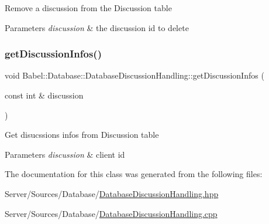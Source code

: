 Remove a discussion from the Discussion table 
\begin{DoxyParams}{Parameters}
{\em discussion} & the discussion id to delete \\
\hline
\end{DoxyParams}
\mbox{\label{classBabel_1_1Database_1_1DatabaseDiscussionHandling_ab4071036b7704d7acba7c09aa77c9d89}} 
\subsubsection{\texorpdfstring{get\+Discussion\+Infos()}{getDiscussionInfos()}}
{\footnotesize\ttfamily void Babel\+::\+Database\+::\+Database\+Discussion\+Handling\+::get\+Discussion\+Infos (\begin{DoxyParamCaption}\item[{const int \&}]{discussion }\end{DoxyParamCaption})}

Get disucssions infos from Discussion table 
\begin{DoxyParams}{Parameters}
{\em discussion} & client id \\
\hline
\end{DoxyParams}


The documentation for this class was generated from the following files\+:\begin{DoxyCompactItemize}
\item 
Server/\+Sources/\+Database/\hyperlink{DatabaseDiscussionHandling_8hpp}{Database\+Discussion\+Handling.\+hpp}\item 
Server/\+Sources/\+Database/\hyperlink{DatabaseDiscussionHandling_8cpp}{Database\+Discussion\+Handling.\+cpp}\end{DoxyCompactItemize}
